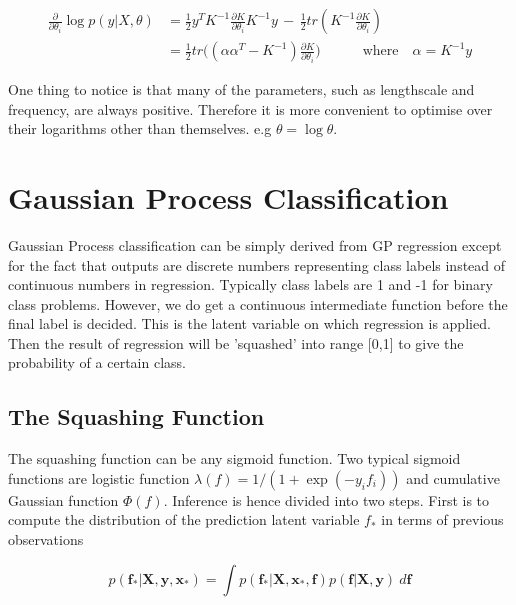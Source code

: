 \documentclass[11pt]{report}
\numberwithin{equation}{chapter}
\begin{document}
\begin{spacing}{2}
\begin{equation}
\begin{split}
\frac{\partial}{\partial \theta_i} \operatorname{log}p(y|X,\theta) & = \frac{1}{2}y^T K^{-1}\frac{\partial K}{\partial \theta_i}K^{-1}y \, - \, \frac{1}{2}tr(K^{-1}\frac{\partial K}{\partial \theta_i}) \\ & = \frac{1}{2}tr\big( (\alpha\alpha^T - K^{-1})\frac{\partial K}{\partial \theta_i}\big) \quad\quad\quad \mbox{where}\quad\alpha = K^{-1}y
\end{split}
\end{equation}

One thing to notice is that many of the parameters, such as lengthscale and frequency, are always positive. Therefore it is more convenient to optimise over their logarithms other than themselves. e.g $\theta = \operatorname{log}\theta$. 









\section{Gaussian Process Classification}
Gaussian Process classification can be simply derived from GP regression except for the fact that outputs are discrete numbers representing class labels instead of continuous numbers in regression. Typically class labels are 1 and -1 for binary class problems. However, we do get a continuous intermediate function before the final label is decided. This is the latent variable on which regression is applied. Then the result of regression will be 'squashed' into range [0,1] to give the probability of a certain class.


\subsection{The Squashing Function}
\label{sigmoid function}
The squashing function can be any sigmoid function. Two typical sigmoid functions are logistic function $\lambda (f) = 1/(1 + \operatorname{exp}(-y_if_i))$ and cumulative Gaussian function $\Phi (f) $. Inference is hence divided into two steps. First is to compute  the distribution of the prediction latent variable $f_*$ in terms of previous observations 

\begin{equation}
\label{classification_prediction}
p(\boldsymbol f_*|\boldsymbol X,\boldsymbol y,\boldsymbol x_*) = \int p(\boldsymbol f_*|\boldsymbol X,\boldsymbol x_*,\boldsymbol f)p(\boldsymbol f|\boldsymbol X,\boldsymbol y)\ d\boldsymbol f
\end{equation}


\end{spacing}
\end{document}

